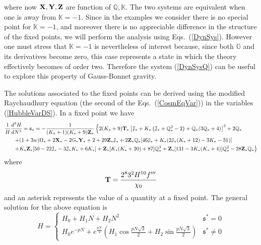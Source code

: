 \documentclass[a4paper,aps,onecolumn,nofootinbib]{revtex4}
\def\rf#1{(\ref{#1})}
\begin{document}
where now ${\bf X},{\bf Y},{\bf Z}$ are function of $\mathbb{Q},\mathbb{K}$. The two systems are equivalent when one is away from $\mathbb{K}=-1$. Since in the examples we consider there is no special point for $\mathbb{K}=-1$, and moreover there is no appreciable difference in the structure of the fixed points,  we will perform the analysis using Eqs.~\rf{DynSys}. However one must stress that $\mathbb{K}=-1$ 
is nevertheless of interest because, since both $\mathbb{G}$ and its derivatives become zero, 
this case represents a state in which the theory  effectively becomes of order two.  Therefore the system \rf{DynSysQ} can be useful to explore this property of Gauss-Bonnet gravity.
 
The solutions associated to the fixed points can be derived using the modified Raychaudhury equation (the second of the  Eqs.~\rf{CosmEqVar}) in the variables \rf{HubbleVarDS}. In a fixed point we have
\begin{equation}\label{mathfraks}
\begin{split}
&\frac{1}{H}\frac{ d^3{H}}{d N^3}=\mathfrak{s}_*=-\frac{1}{(K_*+1) (K_*+9) {\bf Z}_*} \left\{2 (K_*+9) {\bf T}_* \left[\mathbb{J}_*+K_* \left(\mathbb{J}_*+\mathbb{Q}_*^2-2\right)+\mathbb{Q}_* (3 \mathbb{Q}_*+4)\right]^2+2 \mathbb{Q}_* \right.\\
&\left.~~~~~+(1+3 w) \Omega_*+2 {\bf X}_*-2 \mathbb{G}_* {\bf Y}_*+2+
  29{\bf Z}_* \mathbb{J}_*+2{\bf Z}_* \mathbb{Q}_* [46 \mathbb{J}_*+K_* (2 \mathbb{J}_* (K_*+12)-3 K_*-31)]\right.\\
&\left.~~~~~+K_*{\bf Z}_* [50-22 \mathbb{J}_*-3 \mathbb{J}_* K_*+6 K_*]+{\bf Z}_* [K_* (K_*+20)+87]
   \mathbb{Q}_*^3+{\bf Z}_*[131-3 K_* (K_*+4)] \mathbb{Q}_*^2-28{\bf Z}_* \mathbb{Q}_*\right\}
 \end{split}
\end{equation}
where
\begin{equation}
{\bf T}= \frac{2^8 3^2H^{10}  f'''}{ \chi_0}
\end{equation}
and an asterisk represents the value of a quantity at a fixed point.  The general solution for the above equation is
\begin{equation}\label{SolHGen} 
H=\left\{ 
\begin{array}{ll}
H_0+H_1 N+ H_2 N^2 & \mathfrak{s}^*=0\\
H_0 e^{-p N}+ e^{\frac{p N}{2}}\left(H_1\cos \frac{pN\sqrt{3}}{2}+ H_2 \sin \frac{pN\sqrt{3}}{2}\right)&\mathfrak{s}^*\neq 0
\end{array}
\right.
\end{equation}
\end{document}
